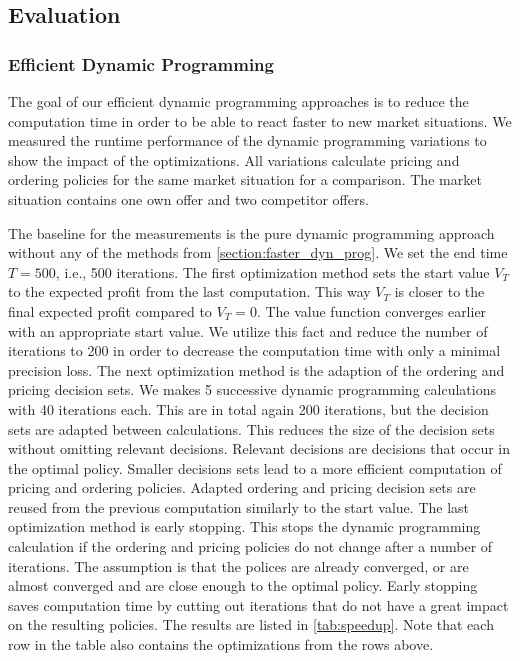 
\subsection{Evaluation}

\subsubsection{Efficient Dynamic Programming}

The goal of our efficient dynamic programming approaches is to reduce the computation time in order to be able to react faster to new market situations.
We measured the runtime performance of the dynamic programming variations to show the impact of the optimizations.
All variations calculate pricing and ordering policies for the same market situation for a comparison.
The market situation contains one own offer and two competitor offers.


The baseline for the measurements is the pure dynamic programming approach without any of the methods from \cref{section:faster_dyn_prog}.
We set the end time $T = 500$, i.e., 500 iterations.
The first optimization method sets the start value $V_T$ to the expected profit from the last computation.
This way $V_T$ is closer to the final expected profit compared to $V_T = 0$.
The value function converges earlier with an appropriate start value.
We utilize this fact and reduce the number of iterations to 200 in order to decrease the computation time with only a minimal precision loss.
The next optimization method is the adaption of the ordering and pricing decision sets.
We makes 5 successive dynamic programming calculations with 40 iterations each.
This are in total again 200 iterations, but the decision sets are adapted between calculations.
This reduces the size of the decision sets without omitting relevant decisions.
Relevant decisions are decisions that occur in the optimal policy.
Smaller decisions sets lead to a more efficient computation of pricing and ordering policies.
Adapted ordering and pricing decision sets are reused from the previous computation similarly to the start value.
The last optimization method is early stopping.
This stops the dynamic programming calculation if the ordering and pricing policies do not change after a number of iterations.
The assumption is that the polices are already converged, or are almost converged and are close enough to the optimal policy.
Early stopping saves computation time by cutting out iterations that do not have a great impact on the resulting policies.
The results are listed in \cref{tab:speedup}.
Note that each row in the table also contains the optimizations from the rows above.

